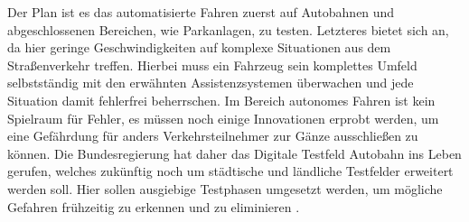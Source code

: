 Der Plan ist es das automatisierte Fahren zuerst auf Autobahnen und abgeschlossenen Bereichen, wie Parkanlagen, zu testen. Letzteres bietet sich an, da hier geringe Geschwindigkeiten auf komplexe Situationen aus dem Straßenverkehr treffen. Hierbei muss ein Fahrzeug sein komplettes Umfeld selbstständig mit den erwähnten Assistenzsystemen überwachen und jede Situation damit fehlerfrei beherrschen. Im Bereich autonomes Fahren ist kein Spielraum für Fehler, es müssen noch einige Innovationen erprobt werden, um eine Gefährdung für anders Verkehrsteilnehmer zur Gänze ausschließen zu können. Die Bundesregierung hat daher das Digitale Testfeld Autobahn ins Leben gerufen, welches zukünftig noch um städtische und ländliche Testfelder erweitert werden soll. Hier sollen ausgiebige Testphasen umgesetzt werden, um mögliche Gefahren frühzeitig zu erkennen und zu eliminieren \cite{AutomatisiertesFahren}.